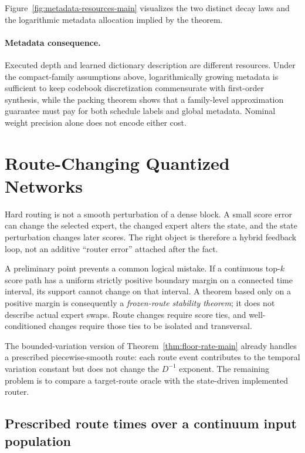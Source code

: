 \documentclass[twoside,11pt]{article}
\begin{document}
Figure~\ref{fig:metadata-resources-main} visualizes the two distinct decay laws and the logarithmic metadata allocation implied by the theorem.

\FloatBarrier

\paragraph{Metadata consequence.}
Executed depth and learned dictionary description are different resources.
Under the compact-family assumptions above, logarithmically growing metadata
is sufficient to keep codebook discretization commensurate with first-order
synthesis, while the packing theorem shows that a family-level approximation
guarantee must pay for both schedule labels and global metadata.  Nominal
weight precision alone does not encode either cost.


\section{Route-Changing Quantized Networks}
\label{sec:hybrid-routing-main}

Hard routing is not a smooth perturbation of a dense block.  A small score error can change the selected expert, the changed expert alters the state, and the state perturbation changes later scores.  The right object is therefore a hybrid feedback loop, not an additive ``router error'' attached after the fact.

A preliminary point prevents a common logical mistake.  If a continuous top-$k$ score path has a uniform strictly positive boundary margin on a connected time interval, its support cannot change on that interval.  A theorem based only on a positive margin is consequently a \emph{frozen-route stability theorem}; it does not describe actual expert swaps.  Route changes require score ties, and well-conditioned changes require those ties to be isolated and transversal.

The bounded-variation version of Theorem~\ref{thm:floor-rate-main} already handles a prescribed piecewise-smooth route: each route event contributes to the temporal variation constant but does not change the $D^{-1}$ exponent.  The remaining problem is to compare a target-route oracle with the state-driven implemented router.

\subsection{Prescribed route times over a continuum input population}
\label{sec:prescribed-route-lp-main}
\end{document}
